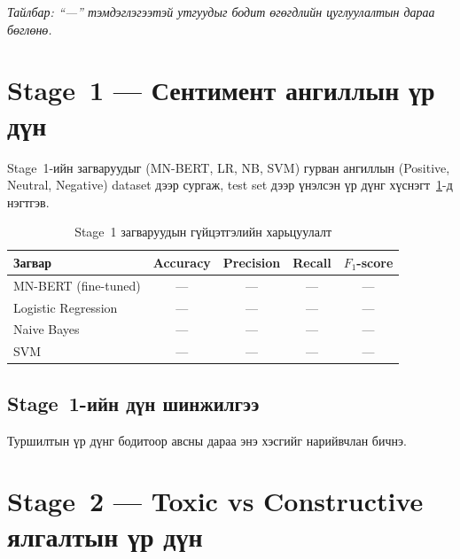 \textit{Тайлбар: ``---'' тэмдэглэгээтэй утгуудыг бодит өгөгдлийн цуглуулалтын
дараа бөглөнө.}

\section{Stage~1 --- Сентимент ангиллын үр дүн}

Stage~1-ийн загваруудыг (MN-BERT, LR, NB, SVM) гурван ангиллын (Positive,
Neutral, Negative) dataset дээр сургаж, test set дээр үнэлсэн үр дүнг
хүснэгт~\ref{tab:stage1-results}-д нэгтгэв.

\begin{table}[H]
\centering
\caption{Stage~1 загваруудын гүйцэтгэлийн харьцуулалт}
\label{tab:stage1-results}
\begin{tabular}{@{}lcccc@{}}
\toprule
\textbf{Загвар} & \textbf{Accuracy} & \textbf{Precision} & \textbf{Recall} & \textbf{$F_1$-score} \\
\midrule
MN-BERT (fine-tuned) & --- & --- & --- & --- \\
Logistic Regression  & --- & --- & --- & --- \\
Naive Bayes          & --- & --- & --- & --- \\
SVM                  & --- & --- & --- & --- \\
\bottomrule
\end{tabular}
\end{table}


\subsection{Stage~1-ийн дүн шинжилгээ}


Туршилтын үр дүнг бодитоор авсны дараа энэ хэсгийг нарийвчлан бичнэ.

\section{Stage~2 --- Toxic vs Constructive ялгалтын үр дүн}

